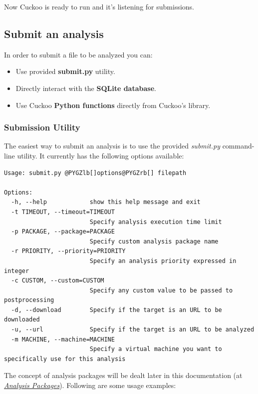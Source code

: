 \documentclass[letterpaper,10pt,english]{sphinxmanual}
\begin{document}
Now Cuckoo is ready to run and it's listening for submissions.


\subsection{Submit an analysis}
\label{usage/submit::doc}\label{usage/submit:submit-an-analysis}
In order to submit a file to be analyzed you can:
\begin{itemize}
\item {} 
Use provided \textbf{submit.py} utility.

\item {} 
Directly interact with the \textbf{SQLite database}.

\item {} 
Use Cuckoo \textbf{Python functions} directly from Cuckoo's library.

\end{itemize}


\subsubsection{Submission Utility}
\label{usage/submit:submission-utility}
The easiest way to submit an analysis is to use the provided \emph{submit.py}
command-line utility. It currently has the following options available:

\begin{Verbatim}[commandchars=@\[\]]
Usage: submit.py @PYGZlb[]options@PYGZrb[] filepath

Options:
  -h, --help            show this help message and exit
  -t TIMEOUT, --timeout=TIMEOUT
                        Specify analysis execution time limit
  -p PACKAGE, --package=PACKAGE
                        Specify custom analysis package name
  -r PRIORITY, --priority=PRIORITY
                        Specify an analysis priority expressed in integer
  -c CUSTOM, --custom=CUSTOM
                        Specify any custom value to be passed to postprocessing
  -d, --download        Specify if the target is an URL to be downloaded
  -u, --url             Specify if the target is an URL to be analyzed
  -m MACHINE, --machine=MACHINE
                        Specify a virtual machine you want to specifically use for this analysis
\end{Verbatim}

The concept of analysis packages will be dealt later in this documentation (at
{\hyperref[usage/packages::doc]{\emph{Analysis Packages}}}). Following are some usage examples:
\end{document}
